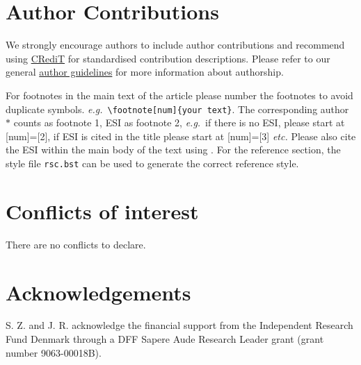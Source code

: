 \documentclass[twoside,twocolumn,9pt]{article}
\renewcommand{\refname}{Notes and references}
\begin{document}
\section*{Author Contributions}
We strongly encourage authors to include author contributions and recommend using \href{https://casrai.org/credit/}{CRediT} for standardised contribution descriptions. Please refer to our general \href{https://www.rsc.org/journals-books-databases/journal-authors-reviewers/author-responsibilities/}{author guidelines} for more information about authorship.

For footnotes in the main text of the article please number the footnotes to avoid duplicate symbols. \textit{e.g.}\ \texttt{\textbackslash footnote[num]\{your text\}}. The corresponding author $\ast$ counts as footnote 1, ESI as footnote 2, \textit{e.g.}\ if there is no ESI, please start at [num]=[2], if ESI is cited in the title please start at [num]=[3] \textit{etc.} Please also cite the ESI within the main body of the text using \dag. For the reference section, the style file \texttt{rsc.bst} can be used to generate the correct reference style.

\section*{Conflicts of interest}
There are no conflicts to declare.

\section*{Acknowledgements}
S. Z. and J. R. acknowledge the financial support from the Independent Research Fund Denmark through a DFF Sapere Aude Research Leader grant (grant number 9063-00018B).





\balance


\end{document}
